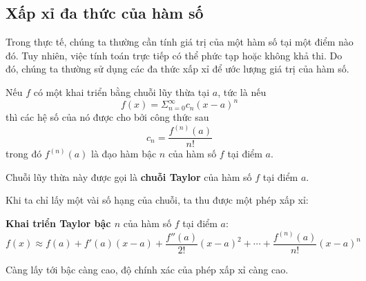 \subsection{Xấp xỉ đa thức của hàm số}
Trong thực tế, chúng ta thường cần tính giá trị của một hàm số tại một điểm nào đó. Tuy nhiên, việc tính toán trực tiếp có thể phức tạp hoặc không khả thi. Do đó, chúng ta thường sử dụng các đa thức xấp xỉ để ước lượng giá trị của hàm số.
\begin{theorem}\label{thm:taylor}
Nếu \(f\) có một khai triển bằng chuỗi lũy thừa tại \(a\), tức là nếu
\begin{equation}
f(x)=\Sigma_{n=0}^{\infty}c_n(x-a)^n
\end{equation}
thì các hệ số của nó được cho bởi công thức sau
\begin{equation}
c_n=\frac{f^{(n)}(a)}{n!}
\end{equation}
trong đó \(f^{(n)}(a)\) là đạo hàm bậc \(n\) của hàm số \(f\) tại điểm \(a\).

Chuỗi lũy thừa này được gọi là \textbf{chuỗi Taylor} của hàm số \(f\) tại điểm \(a\).
\end{theorem}
Khi ta chỉ lấy một vài số hạng của chuỗi, ta thu được một phép xấp xỉ:
\begin{definition}
\textbf{Khai triển Taylor bậc \(n\)} của hàm số \(f\) tại điểm \(a\):
\begin{equation}
f(x)\approx f(a)+f'(a)(x-a)+\frac{f''(a)}{2!}(x-a)^2+\cdots+\frac{f^{(n)}(a)}{n!}(x-a)^n
\end{equation}
\end{definition}
Càng lấy tới bậc càng cao, độ chính xác của phép xấp xỉ càng cao.